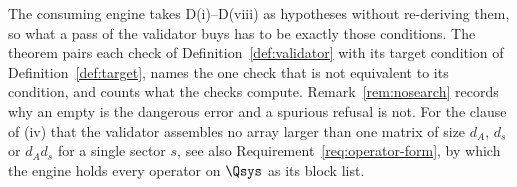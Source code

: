 
The consuming engine takes D(i)--D(viii) as hypotheses without re-deriving
them, so what a pass of the validator buys has to be exactly those
conditions. The theorem pairs each check of Definition~\ref{def:validator}
with its target condition of Definition~\ref{def:target}, names the one check
that is not equivalent to its condition, and counts what the checks compute.
Remark~\ref{rem:nosearch} records why an empty  is the dangerous
error and a spurious refusal is not. For the clause of (iv) that the
validator assembles no array larger than one matrix of size $d_A$, $d_s$ or
$d_Ad_s$ for a single sector $s$, see also
Requirement~\ref{req:operator-form}, by which the engine holds every operator
on $\Qsys$ as its block list.

